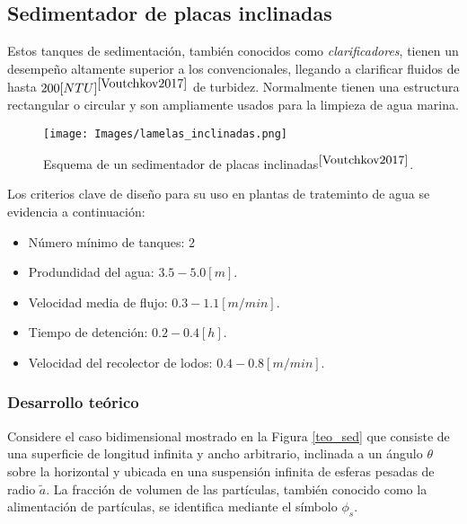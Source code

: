 \newpage

\subsection{Sedimentador de placas inclinadas}

\noindent
\justify

Estos tanques de sedimentaci\'on, tambi\'en conocidos como \textit{clarificadores}, tienen un desempe\~no altamente superior a los convencionales, llegando a clarificar fluidos de hasta $200 [NTU]^{\cite{Voutchkov2017}}$ de turbidez. Normalmente tienen una estructura rectangular o circular y son ampliamente usados para la limpieza de agua marina. 

\begin{figure}[h!]
	\centering
	\texttt{[image: Images/lamelas\_inclinadas.png]}
	\caption{Esquema de un sedimentador de placas inclinadas$^{\cite{Voutchkov2017}}$.}
	\label{lamelas_inclinadas}
\end{figure}


\noindent
\justify

Los criterios clave de dise\~no para su uso en plantas de trateminto de agua se evidencia a continuaci\'on:

\begin{itemize}
	\item N\'umero m\'inimo de tanques: 2
	\item Produndidad del agua: $3.5 - 5.0 [m]$.
	\item Velocidad media de flujo: $0.3 - 1.1 [m/min]$.
	\item Tiempo de detenci\'on: $0.2 - 0.4 [h]$.
	\item Velocidad del recolector de lodos: $0.4 - 0.8 [m/min]$.
\end{itemize}

\subsubsection{Desarrollo te\'orico} \label{Acribos}

\noindent
\justify

Considere el caso bidimensional mostrado en la Figura \ref{teo_sed} que consiste de una superficie de longitud infinita y ancho arbitrario, inclinada a un \'angulo $\theta$ sobre la horizontal y ubicada en una suspensi\'on infinita de esferas pesadas de radio $\tilde{a}$. La fracci\'on de volumen de las part\'iculas, tambi\'en conocido como la alimentaci\'on de part\'iculas, se identifica mediante el s\'imbolo $\phi _s$.

